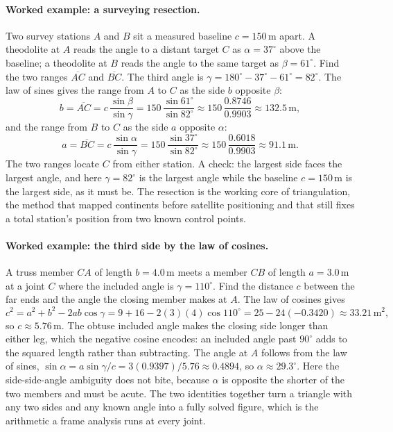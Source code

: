 \paragraph{Worked example: a surveying resection.} Two survey stations $A$
and $B$ sit a measured baseline $c = 150\,\text{m}$ apart. A theodolite at
$A$ reads the angle to a distant target $C$ as $\alpha = 37^{\circ}$ above
the baseline; a theodolite at $B$ reads the angle to the same target as
$\beta = 61^{\circ}$. Find the two ranges $\overline{AC}$ and
$\overline{BC}$. The third angle is $\gamma = 180^{\circ} - 37^{\circ} -
61^{\circ} = 82^{\circ}$. The law of sines gives the range from $A$ to $C$
as the side $b$ opposite $\beta$:
\[
b = \overline{AC} = c\,\frac{\sin\beta}{\sin\gamma}
= 150\,\frac{\sin 61^{\circ}}{\sin 82^{\circ}}
\approx 150\,\frac{0.8746}{0.9903} \approx 132.5\,\text{m},
\]
and the range from $B$ to $C$ as the side $a$ opposite $\alpha$:
\[
a = \overline{BC} = c\,\frac{\sin\alpha}{\sin\gamma}
= 150\,\frac{\sin 37^{\circ}}{\sin 82^{\circ}}
\approx 150\,\frac{0.6018}{0.9903} \approx 91.1\,\text{m}.
\]
The two ranges locate $C$ from either station. A check: the largest side
faces the largest angle, and here $\gamma = 82^{\circ}$ is the largest
angle while the baseline $c = 150\,\text{m}$ is the largest side, as it must
be. The resection is the working core of triangulation, the method that
mapped continents before satellite positioning and that still fixes a
total station's position from two known control points.

\paragraph{Worked example: the third side by the law of cosines.} A
truss member $CA$ of length $b = 4.0\,\text{m}$ meets a member $CB$ of length
$a = 3.0\,\text{m}$ at a joint $C$ where the included angle is $\gamma =
110^{\circ}$. Find the distance $c$ between the far ends and the angle the
closing member makes at $A$. The law of cosines gives
\[
c^{2} = a^{2} + b^{2} - 2ab\cos\gamma
= 9 + 16 - 2(3)(4)\cos 110^{\circ}
= 25 - 24(-0.3420) \approx 33.21\,\text{m}^{2},
\]
so $c \approx 5.76\,\text{m}$. The obtuse included angle makes the closing
side longer than either leg, which the negative cosine encodes: an included
angle past $90^{\circ}$ adds to the squared length rather than subtracting.
The angle at $A$ follows from the law of sines,
$\sin\alpha = a\sin\gamma/c = 3(0.9397)/5.76 \approx 0.4894$, so
$\alpha \approx 29.3^{\circ}$. Here the side-side-angle ambiguity does not
bite, because $\alpha$ is opposite the shorter of the two members and must be
acute. The two identities together turn a triangle with any two sides and
any known angle into a fully solved figure, which is the arithmetic a frame
analysis runs at every joint.

